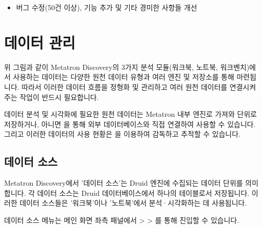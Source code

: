 \documentclass[letterpaper,10pt,english]{sphinxmanual}
\begin{document}
\begin{itemize}
\item {} 
버그 수정(50건 이상), 기능 추가 및 기타 경미한 사항들 개선

\end{itemize}


\chapter{데이터 관리}
\label{\detokenize{discovery/part02/index:id1}}\label{\detokenize{discovery/part02/index::doc}}
\begin{figure}[H]
\centering

\noindent{}
\end{figure}

위 그림과 같이 Metatron Discovery의 3가지 분석 모듈(워크북, 노트북, 워크벤치)에서 사용하는 데이터는 다양한 원천 데이터 유형과 여러 엔진 및 저장소를 통해 마련됩니다. 따라서 이러한 데이터 흐름을 정형화 및 관리하고 여러 원천 데이터를 연결시켜주는 작업이 반드시 필요합니다.

데이터 분석 및 시각화에 필요한 원천 데이터는 Metatron 내부 엔진로 가져와  단위로 저장하거나, 아니면 을 통해 외부 데이터베이스와 직접 연결하여 사용할 수 있습니다. 그리고 이러한 데이터의 사용 현황은 을 이용하여 감독하고 추적할 수 있습니다.


\section{데이터 소스}
\label{\detokenize{discovery/part02/data_source:id1}}\label{\detokenize{discovery/part02/data_source::doc}}
Metatron Discovery에서 '데이터 소스'는 Druid 엔진에 수집되는 데이터 단위를 의미합니다. 각 데이터 소스는 Druid 데이터베이스에서 하나의 테이블로서 저장됩니다. 이러한 데이터 소스들은 '워크북'이나 '노트북'에서 분석·시각화하는 데 사용됩니다.

데이터 소스 메뉴는 메인 화면 좌측 패널에서  \textgreater{}  \textgreater{} 를 통해 진입할 수 있습니다.
\begin{quote}

\begin{figure}[H]
\centering

\noindent{}
\end{figure}
\end{quote}
\end{document}
